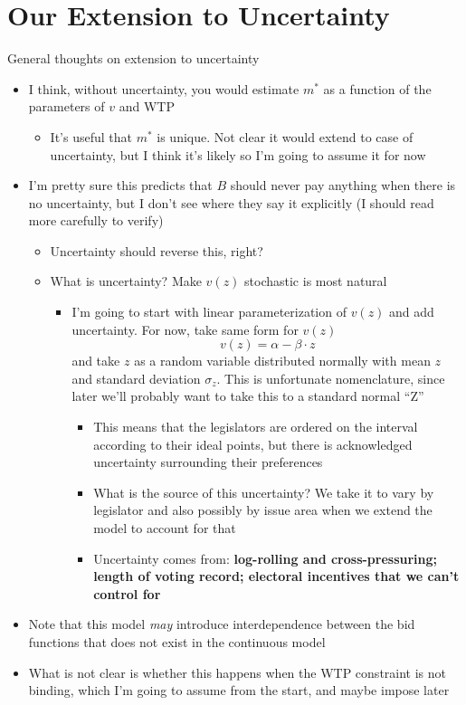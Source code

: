 \documentclass[12pt]{article}
\begin{document}
\section{Our Extension to Uncertainty}
General thoughts on extension to uncertainty
\begin{itemize}
	\item I think, without uncertainty, you would estimate $m^*$ as a function of the parameters of $v$ and WTP
		\begin{itemize}
			\item It's useful that $m^*$ is unique. Not clear it would extend to case of uncertainty, but I think it's likely so I'm going to assume it for now
		\end{itemize}
	\item I'm pretty sure  this predicts that $B$ should never pay anything when there is no uncertainty, but I don't see where they say it explicitly (I should read more carefully to verify)
		\begin{itemize}
			\item Uncertainty should reverse this, right?
			\item What is uncertainty? Make $v(z)$ stochastic is most natural
				\begin{itemize}
					\item I'm going to start with linear parameterization of $v(z)$ and add uncertainty. For now, take same form for $v(z)$
						\[
						  v(z) = \alpha -\beta \cdot z
						\]
						and take $z$ as a random variable distributed normally with mean $z$ and standard deviation $\sigma_z$. This is unfortunate nomenclature, since later we'll probably want to take this to a standard normal ``Z'' 
							\begin{itemize}
								\item This means that the legislators are ordered on the interval according to their ideal points, but there is acknowledged uncertainty surrounding their preferences 
								\item What is the source of this uncertainty? We take it to vary by legislator and also possibly by issue area when we extend the model to account for that
								\item Uncertainty comes from: \textbf{log-rolling and cross-pressuring; length of voting record; electoral incentives that we can't control for}
							\end{itemize}
				\end{itemize}
		\end{itemize}
	\item Note that this model \textit{may} introduce interdependence between the bid functions that does not exist in the continuous model
	\item What is not clear is whether this happens when the WTP constraint is not binding, which I'm going to assume from the start, and maybe impose later
\end{itemize}
\end{document}
